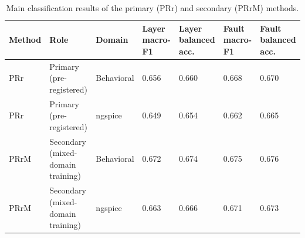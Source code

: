\begin{table}[H]
\caption{Main classification results of the primary (PRr) and secondary (PRrM) methods.\label{tab:table04_main_results}}
\centering
\footnotesize
\begin{tabular}{p{3.2cm}p{1.8cm}p{1.8cm}p{1.8cm}p{1.8cm}p{1.8cm}p{1.8cm}}
\toprule
\textbf{Method} & \textbf{Role} & \textbf{Domain} & \textbf{Layer macro-F1} & \textbf{Layer balanced acc.} & \textbf{Fault macro-F1} & \textbf{Fault balanced acc.} \\
\midrule
PRr & Primary (pre-registered) & Behavioral & 0.656 & 0.660 & 0.668 & 0.670 \\
PRr & Primary (pre-registered) & ngspice & 0.649 & 0.654 & 0.662 & 0.665 \\
PRrM & Secondary (mixed-domain training) & Behavioral & 0.672 & 0.674 & 0.675 & 0.676 \\
PRrM & Secondary (mixed-domain training) & ngspice & 0.663 & 0.666 & 0.671 & 0.673 \\
\bottomrule
\end{tabular}
\par\vspace{2pt}
\end{table}

